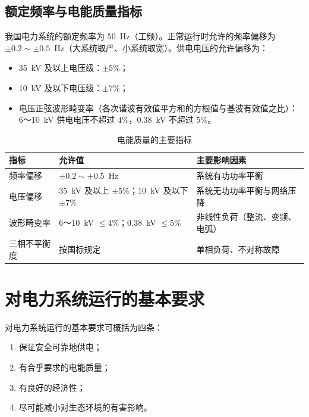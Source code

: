 \subsection{额定频率与电能质量指标}

我国电力系统的额定频率为 $50$~Hz（工频）。正常运行时允许的频率偏移为
$\pm 0.2\sim \pm 0.5$~Hz（大系统取严、小系统取宽）。供电电压的允许偏移为：
\begin{itemize}
  \item 35~kV 及以上电压级：$\pm 5\%$；
  \item 10~kV 及以下电压级：$\pm 7\%$；
  \item 电压正弦波形畸变率（各次谐波有效值平方和的方根值与基波有效值之比）：
        6～10~kV 供电电压不超过 $4\%$，0.38~kV 不超过 $5\%$。
\end{itemize}

\begin{table}[htbp]
  \centering
  \caption{电能质量的主要指标}
  \small
  \begin{tabular}{@{}lll@{}}
    \toprule
    指标 & 允许值 & 主要影响因素 \\
    \midrule
    频率偏移 & $\pm 0.2\sim\pm 0.5$~Hz & 系统有功功率平衡 \\
    电压偏移 & 35~kV 及以上 $\pm 5\%$；10~kV 及以下 $\pm 7\%$ & 系统无功功率平衡与网络压降 \\
    波形畸变率 & 6～10~kV $\le 4\%$；0.38~kV $\le 5\%$ & 非线性负荷（整流、变频、电弧） \\
    三相不平衡度 & 按国标规定 & 单相负荷、不对称故障 \\
    \bottomrule
  \end{tabular}
\end{table}


\section{对电力系统运行的基本要求}

对电力系统运行的基本要求可概括为四条：
\begin{enumerate}
  \item 保证安全可靠地供电；
  \item 有合乎要求的电能质量；
  \item 有良好的经济性；
  \item 尽可能减小对生态环境的有害影响。
\end{enumerate}

